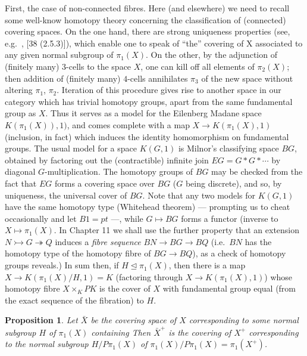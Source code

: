 \documentclass[openany,leqno]{book}  %
\newtheorem{prop}[theorem]{Proposition}
\begin{document}
First, the case of non-connected fibres. Here (and elsewhere) we need to recall some well-know homotopy theory concerning the classification of (connected) covering spaces. On the one hand, there are strong uniqueness properties (see, e.g.\ , [38 (2.5.3)]), which enable one to speak of ``the'' covering of X associated to any given normal subgroup of $\pi_1 (X)$. On the other, by the adjunction of (finitely many) $3$-cells to the space $X$, one can kill off all elements of $\pi_2(X)$; then addition of (finitely many) $4$-cells annihilates $\pi_3$ of the new space without altering $\pi_1$, $\pi_2$. Iteration of this procedure gives rise to another space in our category which has trivial homotopy groups, apart from the same fundamental group as $X$. Thus it serves as a model for the Eilenberg Madane space $K(\pi_1(X)), 1)$, and comes complete with a map $X \longrightarrow K(\pi_1(X), 1)$ (inclusion, in fact) which induces the identity homomorphism on fundamental groups. The usual model for a space $K(G, 1)$ is Milnor's classifying space $BG$, obtained by factoring out the (contractible) infinite join $EG = G*G*\cdots$ by diagonal $G$-multiplication. The homotopy groups of $BG$ may be checked from the fact that $EG$ forms a covering space over $BG$ ($G$ being discrete), and so, by uniqueness, the universal cover of $BG$. Note that any two models for $K(G, 1)$ have the same homotopy type (Whitehead theorem) --- prompting us to cheat occasionally and let $B1 = pt$ ---, while $G \mapsto BG$ forms a functor (inverse to $X\mapsto \pi_1(X)$. In Chapter 11 we shall use the further
property that an extension $N\rightarrowtail G \twoheadrightarrow Q$ induces a {\em fibre sequence} $BN \longrightarrow BG \longrightarrow BQ$ (i.e.\  $BN$ has the homotopy type of the homotopy fibre of $BG\longrightarrow BQ$), as a check of homotopy groups reveals.) In sum then, if $H \unlhd \pi_1 (X)$, then there is a map $X \longrightarrow K(\pi_1(X)/H, 1) = K$ (factoring
through $X\longrightarrow K(\pi_1(X), 1)$) whose homotopy fibre $X \times_K PK$ is the cover of $X$ with fundamental group equal (from the exact sequence of the fibration) to $H$.
\begin{prop}
  Let $\bar{X}$ be the covering space of $X$ corresponding to some normal subgroup $H$ of $\pi_1(X)$ containing Then $\bar{X}^+$ is the covering of $X^+$ corresponding to the
normal subgroup $H/P\pi_1(X)$ of $\pi_1(X)/P\pi_1(X) = \pi_1(X^+)$.
\end{prop}
\end{document}
